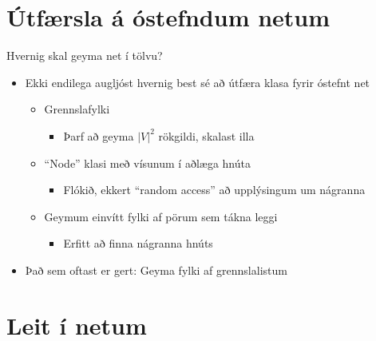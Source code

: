 \documentclass{beamer}
\begin{document}
\section{Útfærsla á óstefndum netum}


\begin{frame}{Hvernig skal geyma net í tölvu?}
	\begin{itemize}
		\item Ekki endilega augljóst hvernig best sé að útfæra klasa fyrir óstefnt net
		      \begin{itemize}
			      \item Grennslafylki
			            \begin{itemize}
				            \item Þarf að geyma $|V|^2$ rökgildi, skalast illa
			            \end{itemize}
			      \item ``Node'' klasi með vísunum í aðlæga hnúta
			            \begin{itemize}
				            \item Flókið, ekkert ``random access'' að upplýsingum um nágranna
			            \end{itemize}
			      \item Geymum einvítt fylki af pörum sem tákna leggi
			            \begin{itemize}
				            \item Erfitt að finna nágranna hnúts
			            \end{itemize}
		      \end{itemize}
		\item Það sem oftast er gert: Geyma fylki af grennslalistum 
	\end{itemize}
\end{frame}





\section{Leit í netum}

\end{document}
